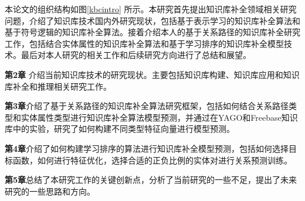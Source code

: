 本论文的组织结构如图\ref{kbcintro} 所示。本研究首先提出知识库补全领域相关研究问题，介绍了知识库技术国内外研究现状，包括基于表示学习的知识库补全算法和基于符号逻辑的知识库补全算法。接着介绍本人的基于关系路径的知识库补全研究工作，包括结合实体属性的知识库补全算法和基于学习排序的知识库补全模型技术。最后对本人研究的相关工作和后续研究方向进行了总结和展望。

\textbf{第2章} 介绍当前知识库技术的研究现状。主要包括知识库构建、知识库应用和知识库补全和推理相关研究工作。

\textbf{第3章}介绍了基于关系路径的知识库补全算法研究框架，包括如何结合关系路径类型和实体属性类型进行知识库补全算法模型预测，并通过在YAGO和Freebase知识库中的实验，研究了如何构建不同类型特征向量进行模型预测。

\textbf{第4章}介绍了如何构建学习排序的算法进行知识库补全模型预测，包括如何选择目标函数，如何进行特征优化，选择合适的正负比例的实体对进行关系预测训练。

\textbf{第5章}总结了本研究工作的关键创新点，分析了当前研究的一些不足，提出了未来研究的一些思路和方向。

